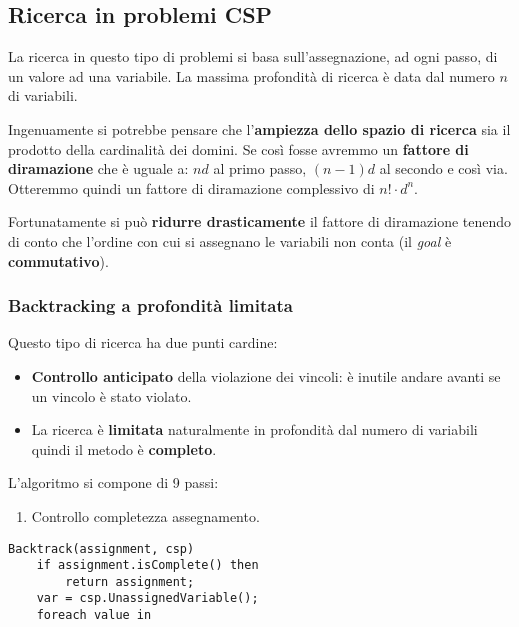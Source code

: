 \subsection{Ricerca in problemi CSP}
La ricerca in questo tipo di problemi si basa sull'assegnazione, ad ogni passo, di un valore ad una variabile.
La massima profondit\`a di ricerca \`e data dal numero $n$ di variabili.

Ingenuamente si potrebbe pensare che l'\textbf{ampiezza dello spazio di ricerca} sia il prodotto della cardinalit\`a
dei domini. Se cos\`i fosse avremmo un \textbf{fattore di diramazione} che \`e uguale a: $nd$ al primo passo,
$(n-1)d$ al secondo e cos\`i via. Otteremmo quindi un fattore di diramazione complessivo di $n! \cdot d^n$.

Fortunatamente si pu\`o \textbf{ridurre drasticamente} il fattore di diramazione tenendo di conto che l'ordine con
cui si assegnano le variabili non conta (il \emph{goal} \`e \textbf{commutativo}).

\subsubsection{Backtracking a profondit\`a limitata}
Questo tipo di ricerca ha due punti cardine:
\begin{itemize}
	\item \textbf{Controllo anticipato} della violazione dei vincoli: \`e inutile andare avanti se un vincolo \`e
	      stato violato.
	\item La ricerca \`e \textbf{limitata} naturalmente in profondit\`a dal numero di variabili quindi il metodo
	      \`e \textbf{completo}.
\end{itemize}
L'algoritmo si compone di 9 passi:
\begin{enumerate}
	\item Controllo completezza assegnamento.
\end{enumerate}
\begin{lstlisting}[style=pseudo-style]
Backtrack(assignment, csp)
	if assignment.isComplete() then
		return assignment;
	var = csp.UnassignedVariable();
	foreach value in 
\end{lstlisting}